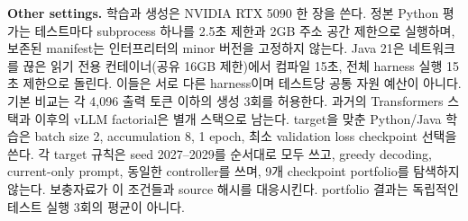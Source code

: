 \documentclass[10pt,conference]{IEEEtran}
\begin{document}
\noindent\textbf{Other settings.} 학습과 생성은 NVIDIA RTX 5090 한 장을 쓴다. 정본 Python 평가는 테스트마다 subprocess 하나를 2.5초 제한과 2GB 주소 공간 제한으로 실행하며, 보존된 manifest는 인터프리터의 minor 버전을 고정하지 않는다. Java 21은 네트워크를 끊은 읽기 전용 컨테이너(공유 16GB 제한)에서 컴파일 15초, 전체 harness 실행 15초 제한으로 돌린다. 이들은 서로 다른 harness이며 테스트당 공통 자원 예산이 아니다. 기본 비교는 각 4,096 출력 토큰 이하의 생성 3회를 허용한다. 과거의 Transformers 스택과 이후의 vLLM factorial은 별개 스택으로 남는다. target을 맞춘 Python/Java 학습은 batch size 2, accumulation 8, 1 epoch, 최소 validation loss checkpoint 선택을 쓴다. 각 target 규칙은 seed 2027--2029를 순서대로 모두 쓰고, greedy decoding, current-only prompt, 동일한 controller를 쓰며, 9개 checkpoint portfolio를 탐색하지 않는다. 보충자료가 이 조건들과 source 해시를 대응시킨다. portfolio 결과는 독립적인 테스트 실행 3회의 평균이 아니다.
\end{document}
